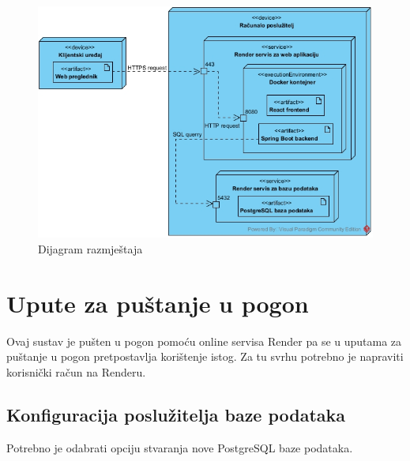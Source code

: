 			\begin{figure}[H]
				\includegraphics[width=\textwidth]{slike/dijagramRazmjestaja.jpg} %
				\caption{Dijagram razmještaja}
				\label{fig:dijagramRazmjestaja} %
			\end{figure}
			
			\eject 
		
		\section{Upute za puštanje u pogon}
			
			Ovaj sustav je pušten u pogon pomoću online servisa Render pa se u uputama za puštanje u pogon pretpostavlja korištenje istog. Za tu svrhu potrebno je napraviti korisnički račun na Renderu. 
			
			\subsection{Konfiguracija poslužitelja baze podataka}
			
			Potrebno je odabrati opciju stvaranja nove PostgreSQL baze podataka.
			
